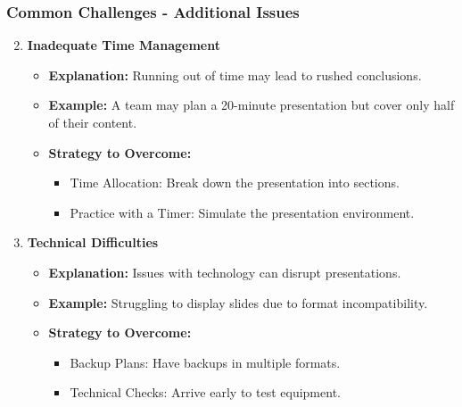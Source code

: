 \documentclass[aspectratio=169]{beamer}
\begin{document}
\begin{frame}[fragile]
    \frametitle{Common Challenges - Additional Issues}
    
    \begin{enumerate}
        \setcounter{enumi}{1}
        \item \textbf{Inadequate Time Management}
        \begin{itemize}
            \item \textbf{Explanation:} Running out of time may lead to rushed conclusions.
            \item \textbf{Example:} A team may plan a 20-minute presentation but cover only half of their content.
            \item \textbf{Strategy to Overcome:}
            \begin{itemize}
                \item Time Allocation: Break down the presentation into sections.
                \item Practice with a Timer: Simulate the presentation environment.
            \end{itemize}
        \end{itemize}
        
        \item \textbf{Technical Difficulties}
        \begin{itemize}
            \item \textbf{Explanation:} Issues with technology can disrupt presentations.
            \item \textbf{Example:} Struggling to display slides due to format incompatibility.
            \item \textbf{Strategy to Overcome:}
            \begin{itemize}
                \item Backup Plans: Have backups in multiple formats.
                \item Technical Checks: Arrive early to test equipment.
            \end{itemize}
        \end{itemize}
    \end{enumerate}
\end{frame}
\end{document}
